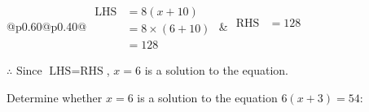 \documentclass[12pt]{article}
\newcounter{minipagecount}
\begin{document}
\begin{multicols}{2}
\begin{minipage}[t]{0.40\textwidth}
    \renewcommand{\arraystretch}{1.3} %
    \begin{tabular}{@{}p{0.60\linewidth}@{}p{0.40\linewidth}@{}}
        \(\begin{aligned}
            \text{LHS} &= 8(x + 10) \\
                    &= 8 \times(6 + 10) \\
                    &= 128
        \end{aligned}\) &
        \(\begin{aligned}
            \text{RHS} &= 128\\
                    & \\
                    &
        \end{aligned}\)
    \end{tabular}
    \renewcommand{\arraystretch}{1.0} %
    \vspace{2pt}  %

    \noindent \(\therefore\) Since \(\text{LHS} = \text{RHS}\), \(x = 6\) is  a solution to the equation.

\end{minipage}

 \vspace*{16pt}
\noindent{(\theminipagecount)}\hspace{0.1mm} %
\begin{minipage}[t]{0.40\textwidth} %

    \noindent Determine whether \(x = 6\) is a solution to the equation \(6(x + 3) = 54\):
    \vspace{4pt}  %

    \noindent


\end{minipage}
\end{multicols}
\end{document}
